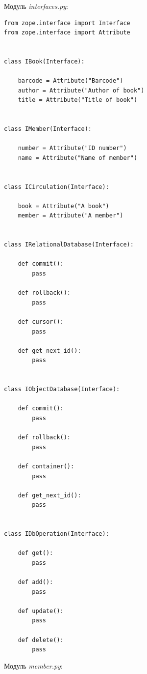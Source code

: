 \documentclass[a4paper,openany,twoside,draft]{book}
\providecommand*{\DUroletitlereference}[1]{\textsl{#1}}
\begin{document}
Модуль \DUroletitlereference{interfaces.py}:

\begin{verbatim}
from zope.interface import Interface
from zope.interface import Attribute


class IBook(Interface):

    barcode = Attribute("Barcode")
    author = Attribute("Author of book")
    title = Attribute("Title of book")


class IMember(Interface):

    number = Attribute("ID number")
    name = Attribute("Name of member")


class ICirculation(Interface):

    book = Attribute("A book")
    member = Attribute("A member")


class IRelationalDatabase(Interface):

    def commit():
        pass

    def rollback():
        pass

    def cursor():
        pass

    def get_next_id():
        pass


class IObjectDatabase(Interface):

    def commit():
        pass

    def rollback():
        pass

    def container():
        pass

    def get_next_id():
        pass


class IDbOperation(Interface):

    def get():
        pass

    def add():
        pass

    def update():
        pass

    def delete():
        pass
\end{verbatim}

Модуль \DUroletitlereference{member.py}:
\end{document}
